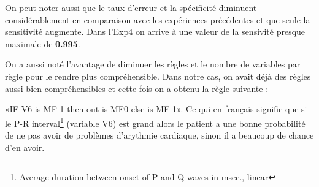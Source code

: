 On peut noter aussi que le taux d’erreur et la spécificité diminuent considérablement en comparaison avec les expériences précédentes et que seule la sensitivité augmente. Dans l'Exp4 on arrive à une valeur de la sensivité presque maximale de \textbf{0.995}.

On a aussi noté l'avantage de diminuer les règles et le nombre de variables par règle pour le rendre plus compréhensible. Dans notre cas, on avait déjà des règles aussi bien compréhensibles et cette fois on a obtenu la règle suivante :

«IF V6 is MF 1 then out is MF0 else is MF 1». Ce qui en français signifie que si le P-R interval\footnote{Average duration between onset of P and Q waves in msec., linear } (variable V6) est grand alors le patient a une bonne probabilité de ne pas avoir de problèmes d’arythmie cardiaque, sinon il a beaucoup de chance d'en avoir.


 
 
 
 


